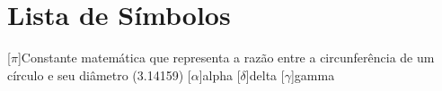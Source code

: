 \chapter*{Lista de Símbolos}
\begin{acronym}[xxxxxxxxx]
    [$\pi$]{Constante matemática que representa a razão entre a circunferência de um círculo e seu diâmetro (3.14159)}
    [$\alpha$]{alpha}
    [$\delta$]{delta}
    [$\gamma$]{gamma}
\end{acronym}